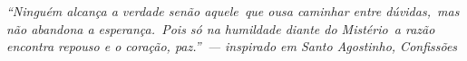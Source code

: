 \begin{apendicesenv}
\begin{flushright}
\textit{
“Ninguém alcança a verdade senão aquele\
que ousa caminhar entre dúvidas,\
mas não abandona a esperança.\
Pois só na humildade diante do Mistério\
a razão encontra repouso e o coração, paz.”\
— inspirado em Santo Agostinho, Confissões
}
\end{flushright}




\end{apendicesenv}
